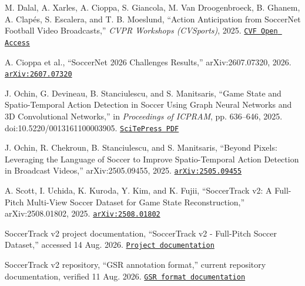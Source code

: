 \documentclass[11pt,a4paper]{article}
\newcommand{\sourcelink}[2]{\href{#1}{\texttt{#2}}}
\begin{document}
\clearpage
\begin{multicols}{2}
\begin{thebibliography}{9}
\scriptsize
\setlength{\itemsep}{0.12em}
\setlength{\parskip}{0pt}

M. Dalal, A. Xarles, A. Cioppa, S. Giancola, M. Van Droogenbroeck, B. Ghanem, A. Clapés, S. Escalera, and T. B. Moeslund,
``Action Anticipation from SoccerNet Football Video Broadcasts,'' \textit{CVPR Workshops (CVSports)}, 2025.\newline
\sourcelink{https://openaccess.thecvf.com/content/CVPR2025W/CVSPORTS/html/Dalal_Action_Anticipation_from_SoccerNet_Football_Video_Broadcasts_CVPRW_2025_paper.html}{CVF Open Access}

A. Cioppa et al., ``SoccerNet 2026 Challenges Results,'' arXiv:2607.07320, 2026.\newline
\sourcelink{https://arxiv.org/abs/2607.07320}{arXiv:2607.07320}

J. Ochin, G. Devineau, B. Stanciulescu, and S. Manitsaris,
``Game State and Spatio-Temporal Action Detection in Soccer Using Graph Neural Networks and 3D Convolutional Networks,'' in \textit{Proceedings of ICPRAM}, pp. 636--646, 2025. doi:10.5220/0013161100003905.\newline
\sourcelink{https://www.scitepress.org/Papers/2025/131611/131611.pdf}{SciTePress PDF}

J. Ochin, R. Chekroun, B. Stanciulescu, and S. Manitsaris,
``Beyond Pixels: Leveraging the Language of Soccer to Improve Spatio-Temporal Action Detection in Broadcast Videos,'' arXiv:2505.09455, 2025.\newline
\sourcelink{https://arxiv.org/abs/2505.09455}{arXiv:2505.09455}

A. Scott, I. Uchida, K. Kuroda, Y. Kim, and K. Fujii,
``SoccerTrack v2: A Full-Pitch Multi-View Soccer Dataset for Game State Reconstruction,'' arXiv:2508.01802, 2025.\newline
\sourcelink{https://arxiv.org/abs/2508.01802}{arXiv:2508.01802}

SoccerTrack v2 project documentation, ``SoccerTrack v2 - Full-Pitch Soccer Dataset,'' accessed 14 Aug. 2026.\newline
\sourcelink{https://atomscott.github.io/SoccerTrack-v2/}{Project documentation}

SoccerTrack v2 repository, ``GSR annotation format,'' current repository documentation, verified 11 Aug. 2026.\newline
\sourcelink{https://github.com/AtomScott/SoccerTrack-v2/blob/main/docs/format-gsr.md}{GSR format documentation}


\end{thebibliography}
\end{multicols}
\end{document}

